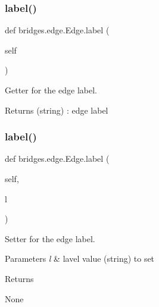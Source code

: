 \subsubsection{\texorpdfstring{label()}{label()}\hspace{0.1cm}{\footnotesize\ttfamily [1/2]}}
{\footnotesize\ttfamily def bridges.\+edge.\+Edge.\+label (\begin{DoxyParamCaption}\item[{}]{self }\end{DoxyParamCaption})}



Getter for the edge label. 

\begin{DoxyReturn}{Returns}
(string) \+: edge label 
\end{DoxyReturn}
\mbox{\label{classbridges_1_1edge_1_1_edge_a16327b62c38de382f24a4e3a06bd5648}} 
\subsubsection{\texorpdfstring{label()}{label()}\hspace{0.1cm}{\footnotesize\ttfamily [2/2]}}
{\footnotesize\ttfamily def bridges.\+edge.\+Edge.\+label (\begin{DoxyParamCaption}\item[{}]{self,  }\item[{}]{l }\end{DoxyParamCaption})}



Setter for the edge label. 


\begin{DoxyParams}{Parameters}
{\em l} & lavel value (string) to set \\
\hline
\end{DoxyParams}
\begin{DoxyReturn}{Returns}


None 
\end{DoxyReturn}
\mbox{\label{classbridges_1_1edge_1_1_edge_ab65d08382b8773d4051e2a1161db8ca6}} 
